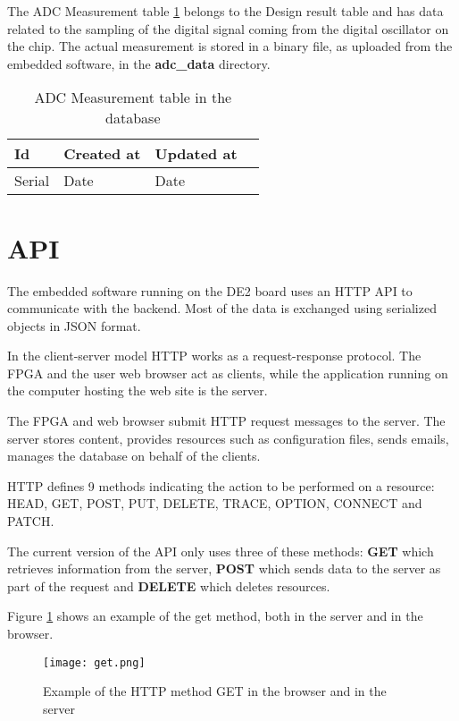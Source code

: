 The ADC Measurement table \ref{tab:ADC_measurement_table} belongs to the Design result table and has data related to the sampling of the digital signal coming from the digital oscillator
on the chip. The actual measurement is stored in a binary file, as uploaded from the embedded software, in the \textbf{adc\_data} directory.

\begin{table}[h!]
\centering
    \begin{tabular}{| l | l | l | l |}
	\hline
       Id & Created at & Updated at \\ \hline
       Serial & Date & Date\\ \hline
    \end{tabular}
    \caption{ADC Measurement table in the database}
    \label{tab:ADC_measurement_table}
\end{table}


\section{API}
The embedded software running on the DE2 board uses an HTTP API to communicate with
the backend. Most of the data is exchanged using serialized objects in JSON format.

In the client-server model HTTP works as a request-response protocol. The FPGA and the user web browser act as clients, while the application running
on the computer hosting the web site is the server.

The FPGA and web browser submit HTTP request messages to the server. The server stores content, provides resources such as configuration files, sends emails, manages the database on behalf of the clients.

HTTP defines 9 methods indicating the action to be performed on a resource: HEAD, GET, POST, PUT, DELETE, TRACE, OPTION, CONNECT and PATCH.

The current version of the API only uses three of these methods: {\bf GET} which retrieves information from the server,
{\bf POST} which sends data to the server as part of the request and {\bf DELETE} which deletes resources.

Figure \ref{fig:get_example} shows an example of the get method, both in the server and in the browser.

\begin{figure}[htb]
\centering
\texttt{[image: get.png]}
\caption{Example of the HTTP method GET in the browser and in the server}
\label{fig:get_example}
\end{figure}

